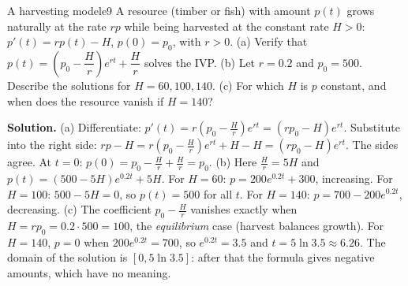\documentclass[11pt]{article}
\begin{document}
\begin{exmp}{A harvesting model}{e9}
A resource (timber or fish) with amount $p(t)$ grows naturally at the rate $rp$ while being harvested at the constant rate $H>0$: $p'(t)=rp(t)-H$, $p(0)=p_0$, with $r>0$. (a) Verify that $p(t)=\left(p_0-\dfrac Hr\right)e^{rt}+\dfrac Hr$ solves the IVP. (b) Let $r=0.2$ and $p_0=500$. Describe the solutions for $H=60,100,140$. (c) For which $H$ is $p$ constant, and when does the resource vanish if $H=140$?

\textbf{Solution.} (a) Differentiate: $p'(t)=r\left(p_0-\frac Hr\right)e^{rt}=(rp_0-H)e^{rt}$. Substitute into the right side: $rp-H=r\left(p_0-\frac Hr\right)e^{rt}+H-H=(rp_0-H)e^{rt}$. The sides agree. At $t=0$: $p(0)=p_0-\frac Hr+\frac Hr=p_0$.
(b) Here $\frac Hr=5H$ and $p(t)=(500-5H)e^{0.2t}+5H$. For $H=60$: $p=200e^{0.2t}+300$, increasing. For $H=100$: $500-5H=0$, so $p(t)=500$ for all $t$. For $H=140$: $p=700-200e^{0.2t}$, decreasing.
(c) The coefficient $p_0-\frac Hr$ vanishes exactly when $H=rp_0=0.2\cdot500=100$, the \emph{equilibrium} case (harvest balances growth). For $H=140$, $p=0$ when $200e^{0.2t}=700$, so $e^{0.2t}=3.5$ and $t=5\ln3.5\approx6.26$. The domain of the solution is $[0,5\ln3.5]$: after that the formula gives negative amounts, which have no meaning.


\end{exmp}
\end{document}
